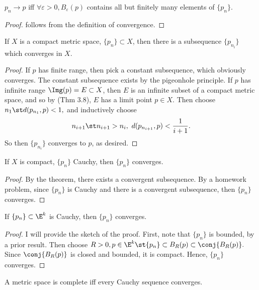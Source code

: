 \documentclass{notes}
\begin{document}
\begin{theorem}
  $p_n\to p$ iff $\forall \varepsilon > 0 , B_\varepsilon(p)$ contains all but finitely many elements
  of $\{p_n\}$.
\end{theorem}
\begin{proof}
  follows from the definition of convergence.
\end{proof}

\begin{theorem}
  If $X$ is a compact metric space, $\{p_n\} \subset X$, then there is a subsequence $\{p_{n_i}\}$
  which converges in $X$.
\end{theorem}
\begin{proof}
  If $p$ has finite range, then pick a constant subsequence, which obviously converges. The constant 
  subsequence exists by the pigeonhole principle. If $p$ has infinite range $\Img(p) = E \subset X$,
  then $E$ is an infinite subset of a compact metric space, and so by (Thm 3.8), $E$ has a limit point
  $p\in X$. Then choose $n_1 \st d(p_{n_1}, p) < 1,$ and inductively choose $$n_{i+1} \st n_{i+1} > n_i,
  \ d(p_{n_{i + 1}}, p) < \frac{1}{i + 1}.$$ So then $\{p_{n_i}\}$ converges to $p$, as desired.
\end{proof}

\begin{corollary}
If $X$ is compact, $\{p_n\}$ Cauchy,  then $\{p_n\}$ converges.
\end{corollary}
\begin{proof}
 By the theorem, there exists a convergent subsequence. By a homework problem, since $\{p_n\}$ is 
 Cauchy and there is a convergent subsequence, then $\{p_n\}$ converges.
\end{proof}

\begin{corollary}
  If $\{p_n\} \subset \E^k$ is Cauchy, then $\{p_n\}$ converges.
\end{corollary}
\begin{proof}
  I will provide the sketch of the proof. First, note that $\{p_n\}$ is bounded, by a prior result.
  Then choose $R > 0, p\in\E^k  \st \{p_n\} \subset B_R(p) \subset \conj{B_R(p)}.$ Since $\conj{B_R(p)}$
  is closed and bounded, it is compact. Hence, $\{p_n\}$ converges.
\end{proof}

\begin{defn}
  A metric space is complete iff every Cauchy sequence converges.
\end{defn}
\end{document}
